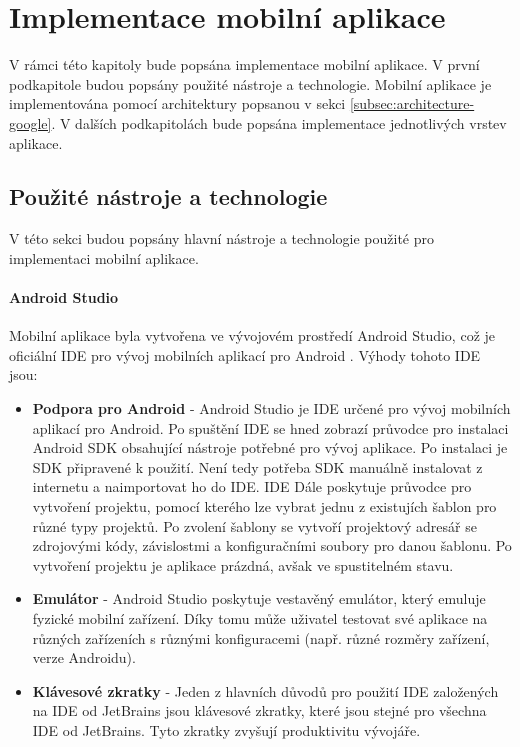\chapter{Implementace mobilní aplikace}
\label{ch:implementation}

\begin{chapterabstract}
	V rámci této kapitoly bude popsána implementace mobilní aplikace. V první podkapitole budou popsány použité nástroje a technologie. Mobilní aplikace je implementována pomocí architektury popsanou v sekci \ref{subsec:architecture-google}. V dalších podkapitolách bude popsána implementace jednotlivých vrstev aplikace.
\end{chapterabstract}

\section{Použité nástroje a technologie}
V této sekci budou popsány hlavní nástroje a technologie použité pro implementaci mobilní aplikace.

\subsubsection *{Android Studio}
Mobilní aplikace byla vytvořena ve vývojovém prostředí Android Studio, což je oficiální IDE pro vývoj mobilních aplikací pro Android \cite{androidstudio}. Výhody tohoto IDE jsou:

\begin{itemize}
	\item \textbf{Podpora pro Android} - Android Studio je IDE určené pro vývoj mobilních aplikací pro Android. Po spuštění IDE se hned zobrazí průvodce pro instalaci Android SDK obsahující nástroje potřebné pro vývoj aplikace. Po instalaci je SDK připravené k použití. Není tedy potřeba SDK manuálně instalovat z internetu a naimportovat ho do IDE. IDE Dále poskytuje průvodce pro vytvoření projektu, pomocí kterého lze vybrat jednu z existujích šablon pro různé typy projektů. Po zvolení šablony se vytvoří projektový adresář se zdrojovými \linebreak kódy, závislostmi a konfiguračními soubory pro danou šablonu. Po vytvoření projektu je aplikace prázdná, avšak ve spustitelném stavu.
	
	\item \textbf{Emulátor} - Android Studio poskytuje vestavěný emulátor, který emuluje fyzické mobilní zařízení. Díky tomu může uživatel testovat své aplikace na různých zařízeních s různými konfiguracemi (např. různé rozměry zařízení, verze Androidu).
		
	\item \textbf{Klávesové zkratky} - Jeden z hlavních důvodů pro použití IDE založených na IDE od JetBrains jsou klávesové zkratky, které jsou stejné pro všechna IDE od JetBrains. Tyto zkratky zvyšují produktivitu vývojáře.
\end{itemize}

